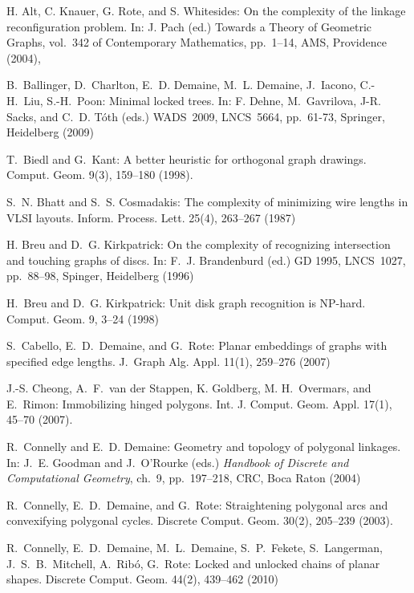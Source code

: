 \documentclass{article}
\theoremstyle{plain}%
\begin{document}
\begin{thebibliography}{99}

H. Alt, C. Knauer, G. Rote, and S. Whitesides:
On the complexity of the linkage reconfiguration problem.
In: J. Pach (ed.) Towards a Theory of Geometric Graphs,
vol.~342 of Contemporary Mathematics, pp.~1--14,
AMS, Providence (2004), 

B.~Ballinger, D.~Charlton, E.~D. Demaine, M.~L. Demaine, J.~Iacono, C.-H.~Liu, S.-H.~Poon:
Minimal locked trees.
In: F. Dehne, M.~Gavrilova, J-R. Sacks, and C.~D. T\'oth (eds.) WADS~2009, LNCS~5664, pp.~61-73, Springer, Heidelberg (2009)

T.~Biedl and G.~Kant:
A better heuristic for orthogonal graph drawings.
Comput. Geom. 9(3), 159--180 (1998).

S.~N. Bhatt and S.~S. Cosmadakis:
The complexity of minimizing wire lengths in VLSI layouts.
Inform. Process. Lett. 25(4), 263--267 (1987)

H. Breu and D.~G. Kirkpatrick:
On the complexity of recognizing intersection and touching graphs of discs.
In: F.~J. Brandenburd (ed.) GD 1995, LNCS~1027, pp.~88--98, Spinger, Heidelberg (1996)

H.~Breu and D.~G. Kirkpatrick:
Unit disk graph recognition is NP-hard.
Comput. Geom. 9, 3--24 (1998)

S.~Cabello, E.~D.~Demaine, and G.~Rote:
Planar embeddings of graphs with specified edge lengths.
J.~Graph Alg. Appl.  11(1), 259--276 (2007)

J.-S. Cheong, A.~F.~van der Stappen, K. Goldberg, M. H.~Overmars, and E.~Rimon:
Immobilizing hinged polygons.
Int. J. Comput. Geom. Appl. 17(1), 45--70 (2007).

R.~Connelly and E.~D. Demaine:
Geometry and topology of polygonal linkages.
In: J.~E. Goodman and J.~O'Rourke (eds.) \emph{Handbook of Discrete and Computational Geometry}, 
ch.~9, pp.~197--218, CRC, Boca Raton (2004)

R.~Connelly, E.~D.~Demaine, and G.~Rote:
Straightening polygonal arcs and convexifying polygonal cycles.
Discrete Comput. Geom. 30(2), 205--239 (2003).

R.~Connelly, E.~D.~Demaine, M.~L.~Demaine, S.~P.~Fekete, S.~Langerman, J.~S.~B.~Mitchell, A.~Rib\'o, G.~Rote:
Locked and unlocked chains of planar shapes.
Discrete Comput. Geom. 44(2), 439--462 (2010)


\end{thebibliography}
\end{document}
